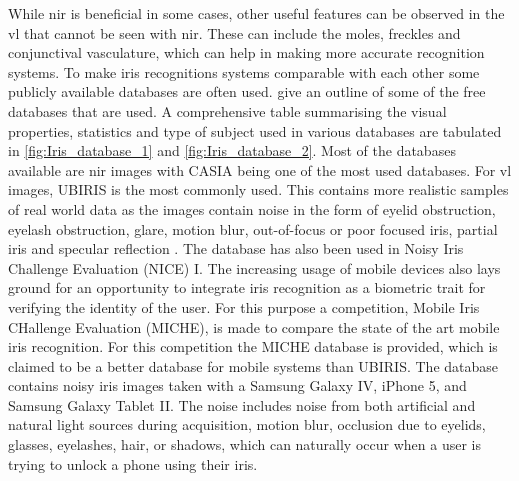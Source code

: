 While \gls{nir} is beneficial in some cases, other useful features can be observed in the \gls{vl} that cannot be seen with \gls{nir}. These can include the moles, freckles and conjunctival vasculature, which can help in making more accurate recognition systems. To make iris recognitions systems comparable with each other some publicly available databases are often used. \cite{Rifaee2017}  give an outline of some of the free databases that are used. A comprehensive table summarising the visual properties, statistics and type of subject used in various databases are tabulated in \autoref{fig:Iris_database_1} and \autoref{fig:Iris_database_2}. Most of the databases available are \gls{nir} images with CASIA being one of the most used databases. For \gls{vl} images, UBIRIS is the most commonly used. This contains more realistic samples of real world data as the images contain noise in the form of eyelid obstruction, eyelash obstruction, glare, motion blur, out-of-focus or poor focused iris, partial iris and specular reflection \citep{Rattani2017}. The database has also been used in Noisy Iris Challenge Evaluation (NICE) I. The increasing usage of mobile devices also lays ground for an opportunity to integrate iris recognition as a biometric trait for verifying the identity of the user. For this purpose a competition, Mobile Iris CHallenge Evaluation (MICHE), is made to compare the state of the art mobile iris recognition. For this competition the MICHE database is provided, which is claimed to be a better database for mobile systems than UBIRIS. The database contains noisy iris images taken with a Samsung Galaxy IV, iPhone 5, and Samsung Galaxy Tablet II. The noise includes noise from both artificial and natural light sources during acquisition, motion blur, occlusion due to eyelids, glasses, eyelashes, hair, or shadows, which can naturally occur when a user is trying to unlock a phone using their iris. 

